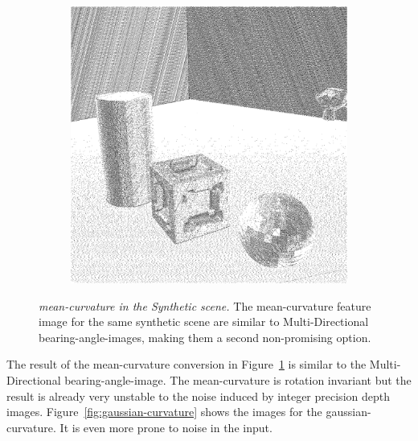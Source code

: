 \begin{figure}[tb]
\begin{subfigure}[t]{0.32\textwidth}
    \end{subfigure}
    \begin{subfigure}[t]{0.32\textwidth}
        \includegraphics[width=\linewidth]{chapter04/img/mean-0210.png}
    \end{subfigure}
    \caption[\Gls{mean-curvature} in the \emph{Synthetic} scene]{\emph{\Gls{mean-curvature} in the Synthetic scene.} The \gls{mean-curvature} feature image for the same synthetic scene are similar to Multi-Directional \Glspl{bearing-angle-image}, making them a second non-promising option.}\label{fig:mean-curvature}
\end{figure}
The result of the \gls{mean-curvature} conversion in Figure~\ref{fig:mean-curvature} is similar to the Multi-Directional \gls{bearing-angle-image}.
The \gls{mean-curvature} is rotation invariant but the result is already very unstable to the noise induced by integer precision depth images.
Figure~\ref{fig:gaussian-curvature} shows the images for the \gls{gaussian-curvature}.
It is even more prone to noise in the input.

